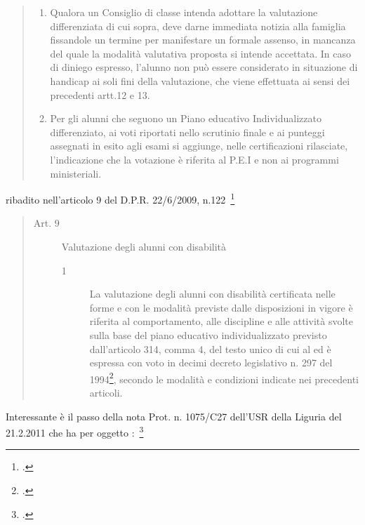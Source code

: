 \begin{quote}
\begin{description}
\begin{enumerate}
				formativi, possono sostenere l'esame di Stato sulla base di prove differenziate coerenti con il
				percorso svolto e finalizzate solo al rilascio dell'attestazione di cui all'art.13 del Regolamento, si fa
				rinvio a quanto previsto dall'art.17, comma 4, dell'O.M. n.29/2001\footcite{OM_29_2001}.
			\item Qualora un Consiglio di classe intenda adottare la valutazione differenziata di cui sopra, deve
			darne immediata notizia alla famiglia fissandole un termine per manifestare un formale assenso, in
			mancanza del quale la modalità valutativa proposta si intende accettata. In caso di diniego
			espresso, l'alunno non può essere considerato in situazione di handicap ai soli fini della
			valutazione, che viene effettuata ai sensi dei precedenti artt.12 e 13.
			\item Per gli alunni che seguono un Piano educativo Individualizzato differenziato, ai voti riportati nello
			scrutinio finale e ai punteggi assegnati in esito agli esami si aggiunge, nelle certificazioni rilasciate,
			l'indicazione che la votazione è riferita al P.E.I e non ai programmi ministeriali.
			\end{enumerate}
		\end{description}
		 \mancatesto
	\end{quote}
ribadito nell'articolo 9 del D.P.R. 22/6/2009, n.122~\footcite{DPR_122_2009}
\begin{quote}
\begin{description}\item [Art. 9] Valutazione degli alunni con disabilità
	\begin{description}
		\item[1]La valutazione degli alunni con disabilità certificata nelle
		forme e con le modalità previste dalle disposizioni in vigore è riferita al comportamento, alle discipline e alle attività svolte sulla base del piano educativo individualizzato previsto
		dall'articolo 314, comma 4, del testo unico di cui al ed è espressa con voto in decimi decreto
		legislativo n. 297 del 1994\footcite{dl_297_1994},
		secondo le modalità e condizioni indicate nei precedenti articoli.
	\end{description}
\end{description}
\end{quote}
Interessante è il passo della nota Prot. n. 1075/C27 dell'USR della Liguria del 21.2.2011 che ha per oggetto :~\footcite{Prot_1075}
